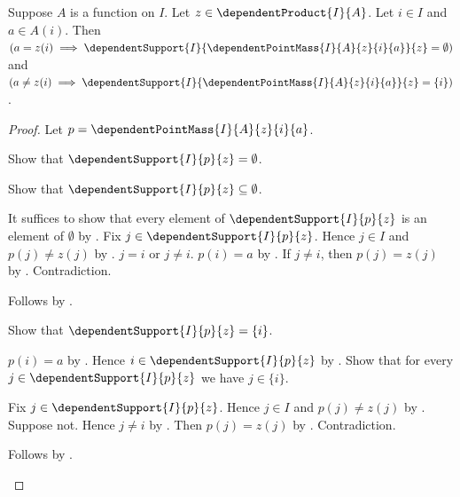 \begin{proposition}\label{dependent_point_mass_support}
    Suppose $A$ is a function on $I$.
    Let $z\in\dependentProduct{I}{A}$.
    Let $i\in I$ and $a\in A(i)$.
    Then
        $(a=z(i)\implies
            \dependentSupport{I}{
                \dependentPointMass{I}{A}{z}{i}{a}}{z}=\emptyset)$ and
        $(a\neq z(i)\implies
            \dependentSupport{I}{
                \dependentPointMass{I}{A}{z}{i}{a}}{z}=\{i\})$.
\end{proposition}
\begin{proof}
    Let $p=\dependentPointMass{I}{A}{z}{i}{a}$.
    \begin{byCase}
        Show that $\dependentSupport{I}{p}{z}=\emptyset$.
        \begin{subproof}
            Show that $\dependentSupport{I}{p}{z}\subseteq\emptyset$.
            \begin{subproof}
                It suffices to show that every element of
                    $\dependentSupport{I}{p}{z}$ is an element of
                    $\emptyset$ by .
                Fix $j\in\dependentSupport{I}{p}{z}$.
                Hence $j\in I$ and $p(j)\neq z(j)$ by
                    .
                $j=i$ or $j\neq i$.
                $p(i)=a$ by
                    .
                If $j\neq i$, then $p(j)=z(j)$ by
                    .
                Contradiction.
            \end{subproof}
            Follows by .
        \end{subproof}
        Show that $\dependentSupport{I}{p}{z}=\{i\}$.
        \begin{subproof}
            $p(i)=a$ by
                .
            Hence $i\in\dependentSupport{I}{p}{z}$ by
                .
            Show that for every $j\in\dependentSupport{I}{p}{z}$
                we have $j\in\{i\}$.
            \begin{subproof}
                Fix $j\in\dependentSupport{I}{p}{z}$.
                Hence $j\in I$ and $p(j)\neq z(j)$ by
                    .
                Suppose not.
                Hence $j\neq i$ by .
                Then $p(j)=z(j)$ by
                    .
                Contradiction.
            \end{subproof}
            Follows by .
        \end{subproof}
    \end{byCase}
\end{proof}

